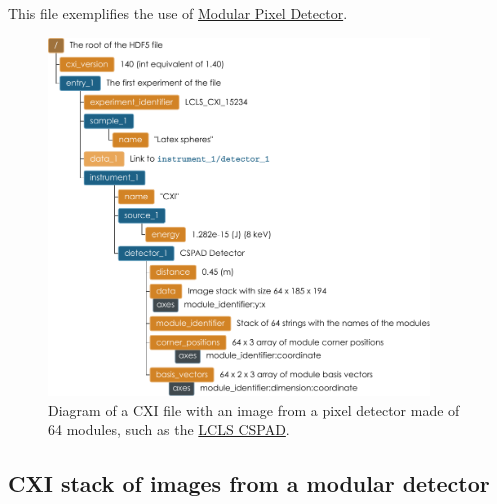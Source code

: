 \documentclass[usletter,11pt]{article}
\begin{document}
This file exemplifies the use of \hyperref[subsec:modularDetectors]{Modular
  Pixel Detector}.
\begin{figure}[h!]
\centering
\includegraphics[width=0.9\textwidth]{modular_detector_cxi.pdf}
\caption{Diagram of a CXI file with an image from a pixel detector made of 64
  modules, such as the \hyperref[fig:cspad]{LCLS CSPAD}.}
\label{fig:modular_detector_cxi}
\end{figure}
\clearpage


\subsection{CXI stack of images from a modular detector}
\end{document}
